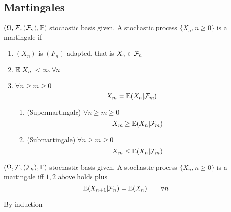\subsection{Martingales}
\begin{dfn}[Martingale] $(\Omega, \mathcal{F}, (\mathcal{F}_n), \mathbb{P})$ stochastic basis given, A stochastic process $\{X_n, n\geq 0\}$ is a martingale if 
\begin{enumerate}
    \item $(X_n)$ is $(F_n)$ adapted, that is $X_n\in\mathcal{F}_n$
    \item $\mathbb{E}|X_n| < \infty, \forall n$
    \item $\forall n\geq m\geq 0$
    \begin{equation*}
        X_m = \mathbb{E}(X_n| \mathcal{F}_m)
    \end{equation*}
    \begin{enumerate}
        \item (Supermartingale) $\forall n\geq m\geq 0$
        \begin{equation*}
        X_m \geq \mathbb{E}(X_n| \mathcal{F}_m)
    \end{equation*}
    \item (Submartingale) $\forall n\geq m\geq 0$
        \begin{equation*}
        X_m \leq \mathbb{E}(X_n| \mathcal{F}_m)
    \end{equation*}
    \end{enumerate}
\end{enumerate}
\end{dfn}
\begin{lem}
$(\Omega, \mathcal{F}, (\mathcal{F}_n), \mathbb{P})$ stochastic basis given, A stochastic process $\{X_n, n\geq 0\}$ is a martingale iff $1, 2$ above holds plus: 
\begin{equation*}
    \mathbb{E}(X_{n+1}|\mathcal{F}_n) = \mathbb{E}(X_n) \qquad \forall n
\end{equation*}
\end{lem}
\pf By induction

